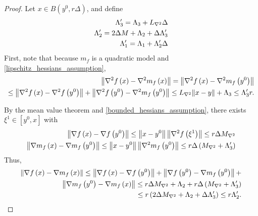 \begin{proof}
Let $x \in B\left(y^{0}, r\Delta\right)$, and define
\begin{align*}
\Lambda_3' = \Lambda_3 + {L_{\nabla^2}} \Delta \\
\Lambda_2' = 2 \Delta M + \Lambda_2 +  \Delta \Lambda_3'\\
\Lambda_1' = \Lambda_1 + \Lambda_2' \Delta\\
\end{align*}
First, note that because $m_f$ is a quadratic model and \cref{lipschitz_hessians_assumption},
\begin{align*}
\left\| \nabla^2 f\left(x\right) - \nabla^2 m_f\left(x\right)\right\|
= \left\| \nabla^2 f\left(x\right) - \nabla^2 m_f\left(y^0\right)\right\| \\
\le \left\| \nabla^2 f\left(x\right) - \nabla^2 f\left(y^0\right)\right\| + \left\| \nabla^2 f\left(y^0\right) - \nabla^2 m_f\left(y^0\right)\right\|
\le {L_{\nabla^2}} \|x - y\| + \Lambda_3 \le  \Lambda_3' r .
\end{align*}


By the mean value theorem and \cref{bounded_hessians_assumption}, there exists $\xi^1 \in [y^0, x]$ with
\begin{align*}
\left\|\nabla f\left(x\right) - \nabla f\left(y^0\right) \right\|
\le \left\|x - y^0\right\| \left\| \nabla^2 f\left(\xi^1\right) \right\|
\le r \Delta {M_{\nabla^2}} \\
\left\|\nabla m_f\left(x\right) - \nabla m_f\left(y^0\right) \right\|
\le \left\|x - y^0\right\| \left\| \nabla^2 m_f\left(y^0\right) \right\|
\le r \Delta \left({M_{\nabla^2}} + \Lambda_3'\right)
\end{align*}
Thus, 
\begin{align*}
\left\|\nabla f\left(x\right) - \nabla m_f\left(x\right)\right\| \le 
\left\| \nabla f\left(x\right) - \nabla f\left(y^0\right) \right\| +
\left\|\nabla f\left(y^0\right) - \nabla m_f\left(y^0\right)\right\| + \\ \left\|\nabla m_f\left(y^0\right) - \nabla m_f\left(x\right)\right\|
\le r \Delta {M_{\nabla^2}} + \Lambda_2 + r \Delta \left({M_{\nabla^2}} + \Lambda_3'\right) \\
\le r \left(2 \Delta {M_{\nabla^2}} + \Lambda_2 +  \Delta \Lambda_3'\right)
\le r \Lambda_2'.
\end{align*}


\end{proof}
